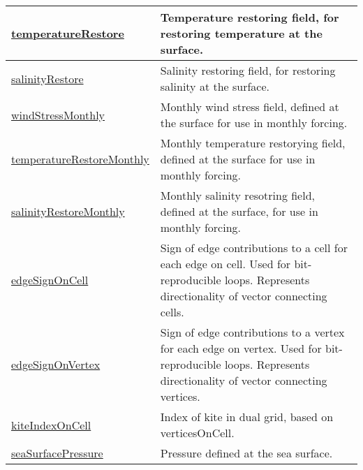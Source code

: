 {\begin{center}
\begin{longtable}{| p{2.0in} | p{4.0in} |}
	\hline
	\hyperref[subsec:var_sec_mesh_temperatureRestore]{temperatureRestore} & Temperature restoring field, for restoring temperature at the surface. \\
	\hline
	\hyperref[subsec:var_sec_mesh_salinityRestore]{salinityRestore} & Salinity restoring field, for restoring salinity at the surface. \\
	\hline
	\hyperref[subsec:var_sec_mesh_windStressMonthly]{windStressMonthly} & Monthly wind stress field, defined at the surface for use in monthly forcing. \\
	\hline
	\hyperref[subsec:var_sec_mesh_temperatureRestoreMonthly]{temperatureRestoreMonthly} & Monthly temperature restorying field, defined at the surface for use in monthly forcing. \\
	\hline
	\hyperref[subsec:var_sec_mesh_salinityRestoreMonthly]{salinityRestoreMonthly} & Monthly salinity resotring field, defined at the surface, for use in monthly forcing. \\
	\hline
	\hyperref[subsec:var_sec_mesh_edgeSignOnCell]{edgeSignOnCell} & Sign of edge contributions to a cell for each edge on cell. Used for bit-reproducible loops. Represents directionality of vector connecting cells. \\
	\hline
	\hyperref[subsec:var_sec_mesh_edgeSignOnVertex]{edgeSignOnVertex} & Sign of edge contributions to a vertex for each edge on vertex. Used for bit-reproducible loops. Represents directionality of vector connecting vertices. \\
	\hline
	\hyperref[subsec:var_sec_mesh_kiteIndexOnCell]{kiteIndexOnCell} & Index of kite in dual grid, based on verticesOnCell. \\
	\hline
	\hyperref[subsec:var_sec_mesh_seaSurfacePressure]{seaSurfacePressure} & Pressure defined at the sea surface. \\
	\hline
\end{longtable}
\end{center}
}

